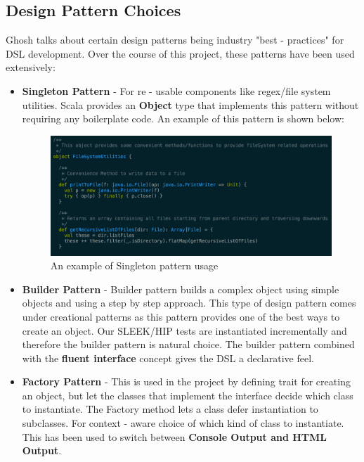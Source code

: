 \documentclass[12pt]{article}
\begin{document}
\subsection{Design Pattern Choices}

Ghosh \cite{dslsInAction} talks about certain design patterns being industry "best - practices" for DSL development. Over the course of this project, these patterns have been used extensively:
\begin{itemize}
\item \textbf{Singleton Pattern} - For re - usable components like regex/file system utilities. Scala provides an \textbf{Object} type that implements this pattern without requiring any boilerplate code. An example of this pattern is shown below:

\begin{figure}[H]
  \centering
    \includegraphics[width=500px]{figures/singleton.png}
  \caption{An example of Singleton pattern usage}
\end{figure}

\item \textbf{Builder Pattern} - Builder pattern builds a complex object using simple objects and using a step by step approach. This type of design pattern comes under creational patterns as this pattern provides one of the best ways to create an object. Our SLEEK/HIP tests are instantiated incrementally and therefore the builder pattern is natural choice. The builder pattern combined with the \textbf{fluent interface} concept gives the DSL a declarative feel.

\item \textbf{Factory Pattern} - This is used in the project by defining trait for creating an object, but let the classes that implement the interface decide which class to instantiate. The Factory method lets a class defer instantiation to subclasses. For context - aware choice of which kind of class to instantiate. This has been used to switch between \textbf{Console Output and HTML Output}.


\end{itemize}
\end{document}
